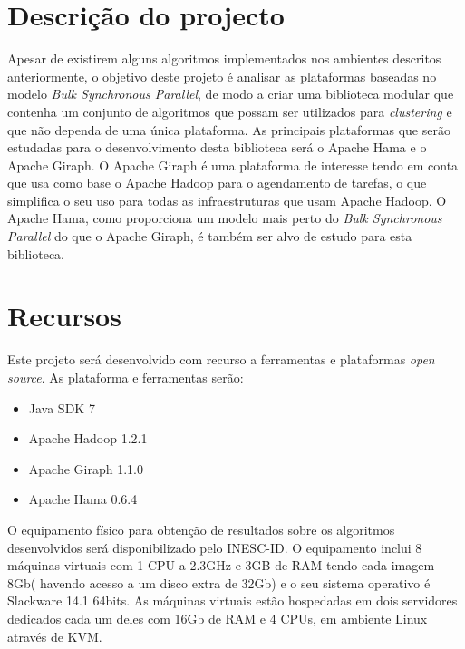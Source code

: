 \section{Descrição do projecto}
Apesar de existirem alguns algoritmos implementados nos ambientes descritos anteriormente, o objetivo deste projeto é analisar as plataformas
baseadas no modelo \textit{Bulk Synchronous Parallel}, de modo a criar uma biblioteca modular que contenha um conjunto de algoritmos que possam ser utilizados para \textit{clustering} e que não dependa de uma única plataforma. As principais plataformas que serão estudadas para o desenvolvimento desta biblioteca será o Apache Hama e o Apache Giraph. 
O Apache Giraph é uma plataforma de interesse tendo em conta que usa como base o Apache Hadoop para o agendamento de tarefas, o que simplifica o seu uso
para todas as infraestruturas que usam Apache Hadoop. O Apache Hama, como proporciona um modelo mais perto do \textit{Bulk Synchronous Parallel} do que o Apache Giraph, é também ser alvo de estudo para esta biblioteca.


\section{Recursos}
Este projeto será desenvolvido com recurso a ferramentas e plataformas \textit{open source}.
As plataforma e ferramentas serão:
\begin{itemize}
 \item Java SDK 7
 \item Apache Hadoop 1.2.1
 \item Apache Giraph 1.1.0
 \item Apache Hama 0.6.4
\end{itemize}

O equipamento físico para obtenção de resultados sobre os algoritmos desenvolvidos será disponibilizado pelo INESC-ID. 
O equipamento inclui 8 máquinas virtuais com 1 CPU a 2.3GHz e 3GB de RAM tendo cada imagem 8Gb( havendo acesso a um disco extra de 32Gb) e o seu sistema operativo é Slackware 14.1 64bits.
As máquinas virtuais estão hospedadas em dois servidores dedicados cada um deles com 16Gb de RAM e 4 CPUs, em ambiente Linux através de KVM.

